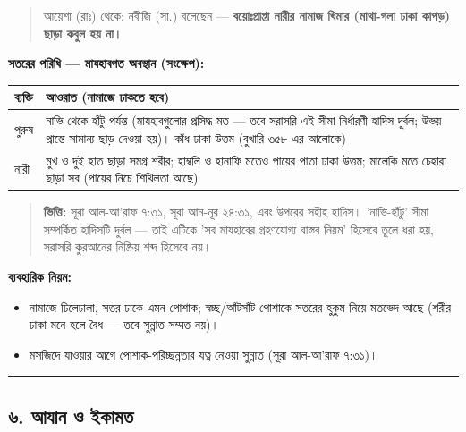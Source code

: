 \begin{quote}
আয়েশা (রাঃ) থেকে: নবীজি (সা.) বলেছেন — \textbf{বয়োঃপ্রাপ্তা নারীর নামাজ খিমার (মাথা-গলা ঢাকা কাপড়) ছাড়া কবুল হয় না।}
\end{quote}

\textbf{সতরের পরিধি — মাযহাবগত অবস্থান (সংক্ষেপ):}

\begin{table}[h]\centering\small
\begin{tabular}{ll}
ব্যক্তি & আওরাত (নামাজে ঢাকতে হবে) \\
\hline
পুরুষ & নাভি থেকে হাঁটু পর্যন্ত (মাযহাবগুলোর প্রসিদ্ধ মত — তবে সরাসরি এই সীমা নির্ধারণী হাদিস দুর্বল; উভয় প্রান্তে সামান্য ছাড় দেওয়া হয়)। কাঁধ ঢাকা উত্তম (বুখারি ৩৫৮-এর আলোকে) \\
নারী & মুখ ও দুই হাত ছাড়া সমগ্র শরীর; হাম্বলি ও হানাফি মতেও পায়ের পাতা ঢাকা উত্তম; মালেকি মতে চেহারা ছাড়া সব (পায়ের নিচে শিথিলতা আছে) \\
\hline
\end{tabular}
\end{table}

\begin{quote}
\textbf{ভিত্তি:} সূরা আল-আ'রাফ ৭:৩১, সূরা আন-নূর ২৪:৩১, এবং উপরের সহীহ হাদিস। 'নাভি-হাঁটু' সীমা সম্পর্কিত হাদিসটি দুর্বল — তাই এটিকে 'সব মাযহাবের গ্রহণযোগ্য বাস্তব নিয়ম' হিসেবে তুলে ধরা হয়, সরাসরি কুরআনের নিষ্ক্রিয় শব্দ হিসেবে নয়।
\end{quote}

\textbf{ব্যবহারিক নিয়ম:}
\begin{itemize}
\item নামাজে ঢিলেঢালা, সতর ঢাকে এমন পোশাক; স্বচ্ছ/আঁটসাঁট পোশাকে সতরের হুকুম নিয়ে মতভেদ আছে (শরীর ঢাকা মনে হলে বৈধ — তবে সুন্নাত-সম্মত নয়)।
\item মসজিদে যাওয়ার আগে পোশাক-পরিচ্ছন্নতার যত্ন নেওয়া সুন্নাত (সূরা আল-আ'রাফ ৭:৩১)।
\end{itemize}
\medskip\hrule\medskip

\subsection*{৬. আযান ও ইকামত}

